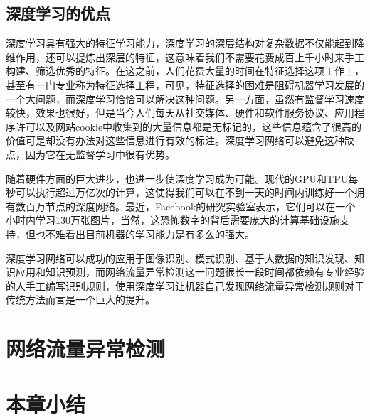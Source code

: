 \subsection{深度学习的优点}

深度学习具有强大的特征学习能力，深度学习的深层结构对复杂数据不仅能起到降维作用，还可以提炼出深层的特征，这意味着我们不需要花费成百上千小时来手工构建、筛选优秀的特征。在这之前，人们花费大量的时间在特征选择这项工作上，甚至有一门专业称为特征选择工程，可见，特征选择的困难是阻碍机器学习发展的一个大问题，而深度学习恰恰可以解决这种问题。另一方面，虽然有监督学习速度较快，效果也很好，但是当今人们每天从社交媒体、硬件和软件服务协议、应用程序许可以及网站cookie中收集到的大量信息都是无标记的，这些信息蕴含了很高的价值可是却没有办法对这些信息进行有效的标注。深度学习网络可以避免这种缺点，因为它在无监督学习中很有优势。

随着硬件方面的巨大进步，也进一步使深度学习成为可能。现代的GPU和TPU每秒可以执行超过万亿次的计算，这使得我们可以在不到一天的时间内训练好一个拥有数百万节点的深度网络。最近，Facebook的研究实验室表示，它们可以在一个小时内学习130万张图片，当然，这恐怖数字的背后需要庞大的计算基础设施支持，但也不难看出目前机器的学习能力是有多么的强大。

深度学习网络可以成功的应用于图像识别、模式识别、基于大数据的知识发现、知识应用和知识预测，而网络流量异常检测这一问题很长一段时间都依赖有专业经验的人手工编写识别规则，使用深度学习让机器自己发现网络流量异常检测规则对于传统方法而言是一个巨大的提升。

\section{网络流量异常检测}

\section{本章小结}
